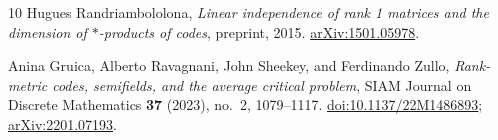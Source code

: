 \begin{thebibliography}{10}
Hugues Randriambololona,
\emph{Linear independence of rank 1 matrices and the dimension of
$*$-products of codes}, preprint, 2015.
\href{https://arxiv.org/abs/1501.05978}{arXiv:1501.05978}.

Anina Gruica, Alberto Ravagnani, John Sheekey, and Ferdinando Zullo,
\emph{Rank-metric codes, semifields, and the average critical problem},
SIAM Journal on Discrete Mathematics \textbf{37} (2023), no.~2, 1079--1117.
\href{https://doi.org/10.1137/22M1486893}{doi:10.1137/22M1486893};
\href{https://arxiv.org/abs/2201.07193}{arXiv:2201.07193}.
\end{thebibliography}
